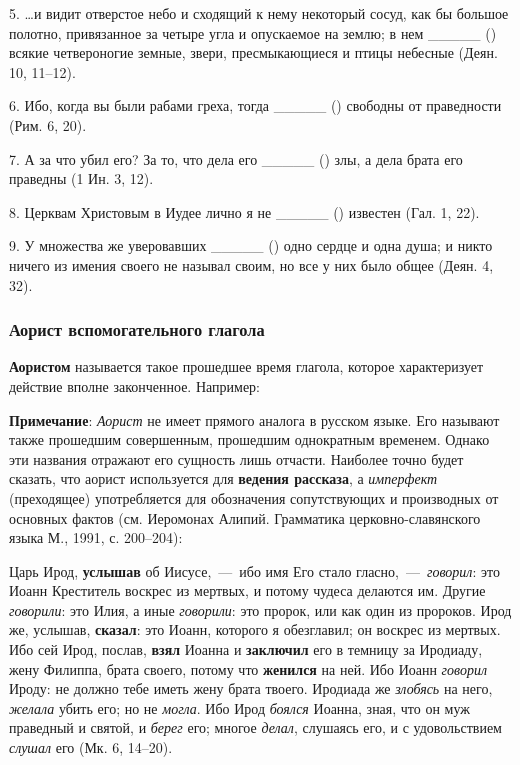 \documentclass[11pt,a4paper,oneside]{memoir}
\newcommand{\hspca}{\hspace{2.4em}}
\begin{document}
    5. \ldots и видит отверстое небо и сходящий к нему некоторый сосуд, как бы большое полотно, привязанное за четыре угла и опускаемое на землю; в нем _____ ({}) всякие четвероногие земные, звери, пресмыкающиеся и птицы небесные (Деян. 10, 11--12).
    
    6. Ибо, когда вы были рабами греха, тогда _____ ({}) свободны от праведности (Рим. 6, 20).
    
    7. А за что убил его? За то, что дела его _____ ({}) злы, а дела брата его праведны (1 Ин. 3, 12).
    
    8. Церквам Христовым в Иудее лично я не _____ ({}) известен (Гал. 1, 22).
    
    9. У множества же уверовавших _____ ({}) одно сердце и одна душа; и никто ничего из имения своего не называл своим, но все у них было общее (Деян. 4, 32).

                \subsubsection{Аорист вспомогательного глагола {}}

    \textbf{Аористом} называется такое прошедшее время глагола, которое характеризует действие вполне законченное. Например:
    
    
    \bigskip\autorows{l}{1}{l}{
        \hspca{{\slv{То́й речѐ и҆}} {\slv{\large бы́ша}} (Пс. 32, 9)}
    }

    \textbf{Примечание}: \emph{Аорист} не имеет прямого аналога в русском языке. Его называют также прошедшим совершенным, прошедшим однократным временем. Однако эти названия отражают его сущность лишь отчасти. Наиболее точно будет сказать, что аорист используется для \textbf{ведения рассказа}, а \emph{имперфект} (преходящее) употребляется для обозначения сопутствующих и производных от основных фактов (см. Иеромонах Алипий. Грамматика церковно-славянского языка М., 1991, с. 200--204):
    
    Царь Ирод, \textbf{услышав} об Иисусе,~---~ибо имя Его стало гласно,~---~\emph{говорил}: это Иоанн Креститель воскрес из мертвых, и потому чудеса делаются им. Другие \emph{говорили}: это Илия, а иные \emph{говорили}: это пророк, или как один из пророков. Ирод же, услышав, \textbf{сказал}: это Иоанн, которого я обезглавил; он воскрес из мертвых. Ибо сей Ирод, послав, \textbf{взял} Иоанна и \textbf{заключил} его в темницу за Иродиаду, жену Филиппа, брата своего, потому что \textbf{женился} на ней. Ибо Иоанн \emph{говорил} Ироду: не должно тебе иметь жену брата твоего. Иродиада же \emph{злобясь} на него, \emph{желала} убить его; но не \emph{могла}. Ибо Ирод \emph{боялся} Иоанна, зная, что он муж праведный и святой, и \emph{берег} его; многое \emph{делал}, слушаясь его, и с удовольствием \emph{слушал} его (Мк. 6, 14--20).
    \pagebreak
    
\end{document}
